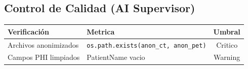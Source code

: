 \documentclass[12pt,a4paper]{article}
\begin{document}
\begin{tcolorbox}[aiSupervisor]
\subsection*{Control de Calidad (AI Supervisor)}

\begin{table}[H]
\centering
\begin{tabular}{llc}
\toprule
\textbf{Verificación} & \textbf{Metrica} & \textbf{Umbral} \\
\midrule
Archivos anonimizados & \texttt{os.path.exists(anon\_ct, anon\_pet)} & Critico \\
Campos PHI limpiados & PatientName vacio & Warning \\
\bottomrule
\end{tabular}
\end{table}

\newpage


\newpage


\newpage


\newpage


\newpage


\newpage


\newpage


\newpage

\end{tcolorbox}
\end{document}
